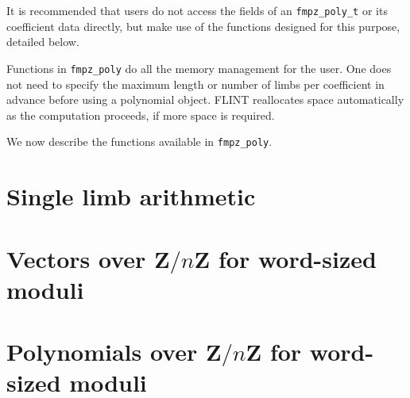 \documentclass[a4paper,10pt]{book}
\newcommand{\Z}{\mathbf{Z}}%
\newcommand{\code}{\lstinline}
\begin{document}
It is recommended that users do not access the fields of an 
\code{fmpz_poly_t} or its coefficient data directly, but make use of the 
functions designed for this purpose, detailed below.

Functions in \code{fmpz_poly} do all the memory management for the user. 
One does not need to specify the maximum length or number of limbs per 
coefficient in advance before using a polynomial object.  FLINT reallocates 
space automatically as the computation proceeds, if more space is required. 

We now describe the functions available in \code{fmpz_poly}.




\chapter{Single limb arithmetic}




\chapter{Vectors over $\Z / n \Z$ for word-sized moduli}




\chapter{Polynomials over $\Z / n \Z$ for word-sized moduli}



\end{document}
